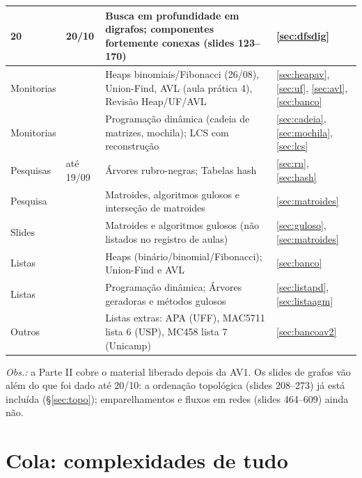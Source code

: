 \documentclass[11pt,a4paper]{article}
\theoremstyle{plain}
\theoremstyle{definition}
\theoremstyle{remark}
\numberwithin{equation}{section}
\begin{document}
\begin{center}
\begin{tabularx}{\linewidth}{@{}llX l@{}}
20 & 20/10 & Busca em profundidade em digrafos; componentes fortemente conexas (slides 123--170) & \ref{sec:dfsdig}\\
\midrule
Monitorias & & Heaps binomiais/Fibonacci (26/08), Union-Find, AVL (aula prática 4), Revisão Heap/UF/AVL & \ref{sec:heapav}, \ref{sec:uf}, \ref{sec:avl}, \ref{sec:banco}\\
Monitorias & & Programação dinâmica (cadeia de matrizes, mochila); LCS com reconstrução & \ref{sec:cadeia}, \ref{sec:mochila}, \ref{sec:lcs}\\
Pesquisas & até 19/09 & Árvores rubro-negras; Tabelas hash & \ref{sec:rn}, \ref{sec:hash}\\
Pesquisa & & Matroides, algoritmos gulosos e interseção de matroides & \ref{sec:matroides}\\
Slides & & Matroides e algoritmos gulosos (não listados no registro de aulas) & \ref{sec:guloso}, \ref{sec:matroides}\\
Listas & & Heaps (binário/binomial/Fibonacci); Union-Find e AVL & \ref{sec:banco}\\
Listas & & Programação dinâmica; Árvores geradoras e métodos gulosos & \ref{sec:listapd}, \ref{sec:listaagm}\\
Outros & & Listas extras: APA (UFF), MAC5711 lista 6 (USP), MC458 lista 7 (Unicamp) & \ref{sec:bancoav2}\\
\bottomrule
\end{tabularx}
\end{center}

\noindent\emph{Obs.:} a Parte II cobre o material liberado depois da AV1. Os slides de grafos vão além do que foi dado até 20/10: a ordenação topológica (slides 208--273) já está incluída (§\ref{sec:topo}); emparelhamentos e fluxos em redes (slides 464--609) ainda não.

\newpage
\section*{Cola: complexidades de tudo}
\end{document}
